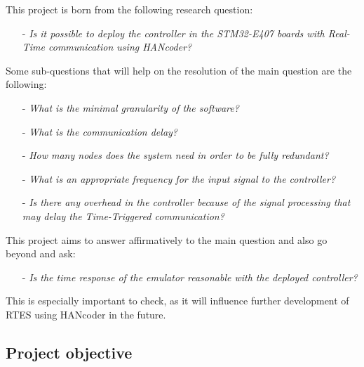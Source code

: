 \documentclass[table,xcdraw]{article}
\begin{document}
This project is born from the following research question: 
\begin{itemize}
    \item[-] \textit{Is it possible to deploy the controller in the STM32-E407 boards with Real-Time communication using HANcoder?}
\end{itemize}
Some sub-questions that will help on the resolution of the main question are the following:
\begin{itemize}
    \item[-] \textit{What is the minimal granularity of the software?}
    \item[-] \textit{What is the communication delay?}
    \item[-] \textit{How many nodes does the system need in order to be fully redundant?}
    \item[-] \textit{What is an appropriate frequency for the input signal to the controller?}
    \item[-] \textit{Is there any overhead in the controller because of the signal processing that may delay the Time-Triggered communication?}
\end{itemize}
This project aims to answer affirmatively to the main question and also go beyond and ask:
\begin{itemize}
    \item[-] \textit{Is the time response of the emulator reasonable with the deployed controller?}
\end{itemize}
This is especially important to check, as it will influence further development of RTES using HANcoder in the future.\\




\newpage
\subsection{Project objective}

\end{document}
